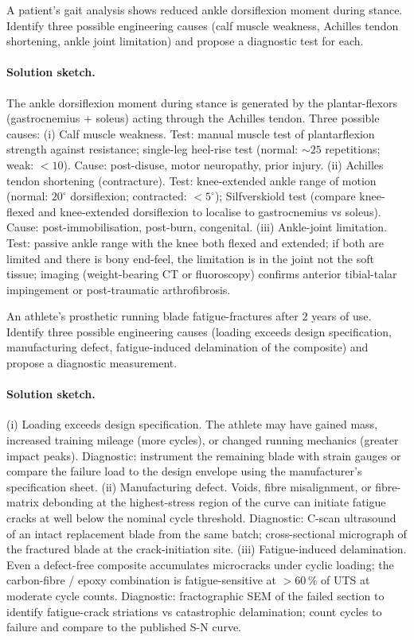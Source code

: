 \begin{exercise}
A patient's gait analysis shows reduced ankle dorsiflexion moment
during stance. Identify three possible engineering causes (calf
muscle weakness, Achilles tendon shortening, ankle joint
limitation) and propose a diagnostic test for each.
\end{exercise}

\paragraph{Solution sketch.}
The ankle dorsiflexion moment during stance is generated by the
plantar-flexors (gastrocnemius + soleus) acting through the Achilles
tendon. Three possible causes:
(i) Calf muscle weakness. Test: manual muscle test of plantarflexion
strength against resistance; single-leg heel-rise test (normal:
$\sim 25$ repetitions; weak: $< 10$). Cause: post-disuse, motor
neuropathy, prior injury.
(ii) Achilles tendon shortening (contracture). Test: knee-extended
ankle range of motion (normal: $20^{\circ}$ dorsiflexion; contracted:
$<5^{\circ}$); Silfverskiold test (compare knee-flexed and
knee-extended dorsiflexion to localise to gastrocnemius vs soleus).
Cause: post-immobilisation, post-burn, congenital.
(iii) Ankle-joint limitation. Test: passive ankle range with the
knee both flexed and extended; if both are limited and there is bony
end-feel, the limitation is in the joint not the soft tissue; imaging
(weight-bearing CT or fluoroscopy) confirms anterior tibial-talar
impingement or post-traumatic arthrofibrosis.

\begin{exercise}
An athlete's prosthetic running blade fatigue-fractures after
$2$ years of use. Identify three possible engineering causes
(loading exceeds design specification, manufacturing defect,
fatigue-induced delamination of the composite) and propose a
diagnostic measurement.
\end{exercise}

\paragraph{Solution sketch.}
(i) Loading exceeds design specification. The athlete may have
gained mass, increased training mileage (more cycles), or changed
running mechanics (greater impact peaks). Diagnostic: instrument the
remaining blade with strain gauges or compare the failure load to
the design envelope using the manufacturer's specification sheet.
(ii) Manufacturing defect. Voids, fibre misalignment, or
fibre-matrix debonding at the highest-stress region of the curve
can initiate fatigue cracks at well below the nominal cycle
threshold. Diagnostic: C-scan ultrasound of an intact replacement
blade from the same batch; cross-sectional micrograph of the
fractured blade at the crack-initiation site.
(iii) Fatigue-induced delamination. Even a defect-free composite
accumulates microcracks under cyclic loading; the carbon-fibre /
epoxy combination is fatigue-sensitive at $> 60\,\%$ of UTS at
moderate cycle counts. Diagnostic: fractographic SEM of the failed
section to identify fatigue-crack striations vs catastrophic
delamination; count cycles to failure and compare to the published
S-N curve.

